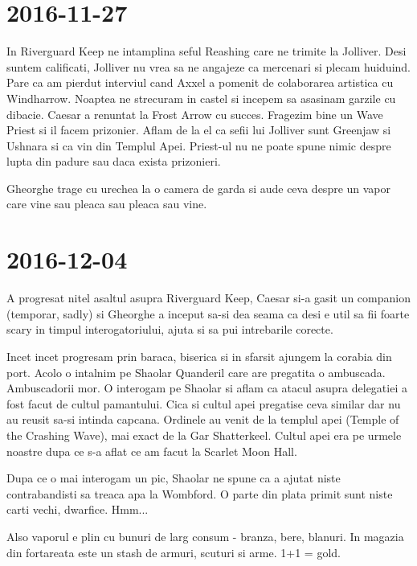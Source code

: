 \documentclass[12pt,oneside]{book}
\begin{document}
\section{2016-11-27}

In Riverguard Keep ne intamplina seful Reashing care ne trimite la Jolliver.
Desi suntem calificati, Jolliver nu vrea sa ne angajeze ca mercenari si plecam 
huiduind. Pare ca am pierdut interviul cand Axxel a pomenit de colaborarea artistica
cu Windharrow.
Noaptea ne strecuram in  castel si incepem sa asasinam garzile cu dibacie. Caesar a
renuntat la Frost Arrow cu succes.
Fragezim bine un Wave Priest si il facem prizonier. Aflam de la el ca sefii lui Jolliver sunt Greenjaw si Ushnara si ca vin din Templul Apei. Priest-ul nu ne poate spune nimic despre lupta din padure sau daca exista prizonieri.

Gheorghe trage cu urechea la o camera de garda si aude ceva despre un vapor care
vine sau pleaca sau pleaca sau vine.

\section{2016-12-04}

A progresat nitel asaltul asupra Riverguard Keep, Caesar si-a gasit un companion (temporar, sadly) si Gheorghe a inceput sa-si dea seama ca desi e util sa fii foarte scary in timpul interogatoriului, ajuta si sa pui intrebarile corecte.

Incet incet progresam prin baraca, biserica si in sfarsit ajungem la corabia din port.
Acolo o intalnim pe Shaolar Quanderil care are pregatita o ambuscada. Ambuscadorii mor. O interogam pe Shaolar si aflam ca atacul asupra delegatiei a fost facut de cultul pamantului. Cica si cultul apei pregatise ceva similar dar nu au reusit sa-si intinda capcana. Ordinele au venit de la templul apei (Temple of the Crashing Wave), mai exact de la Gar Shatterkeel.
Cultul apei era pe urmele noastre dupa ce s-a aflat ce am facut la Scarlet Moon Hall.

Dupa ce o mai interogam un pic, Shaolar  ne spune ca a ajutat niste contrabandisti sa treaca apa la Wombford. O parte din plata primit sunt niste carti vechi, dwarfice.
Hmm...

Also vaporul e plin cu bunuri de larg consum - branza, bere, blanuri. In magazia din fortareata este un stash de armuri, scuturi si arme. 1+1 = gold.

\newpage
\end{document}
